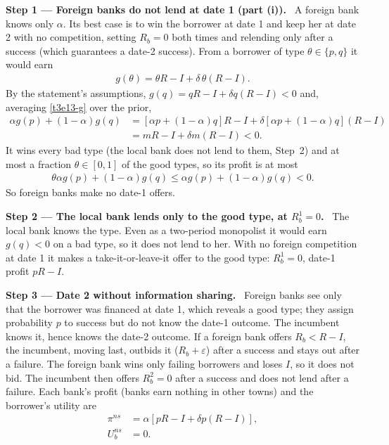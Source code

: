 \documentclass[11pt,a4paper]{article}
\newcommand{\step}[2]{\par\medskip\noindent\textbf{Step #1 --- #2.}~}
\begin{document}
\step{1}{Foreign banks do not lend at date 1 (part (i))} A foreign bank knows only $\alpha$. Its best case
is to win the borrower at date 1 and keep her at date 2 with no competition, setting $R_b=0$ both times
and relending only after a success (which guarantees a date-2 success). From a borrower of
type $\theta\in\{p,q\}$ it would earn
\begin{align}
  g(\theta) = \theta R-I+\delta\,\theta(R-I). \label{t3e13-g}
\end{align}
By the statement's assumptions, $g(q)=qR-I+\delta q(R-I)<0$ and, averaging \eqref{t3e13-g} over the prior,
\begin{align}
  \alpha g(p)+(1-\alpha)g(q) &= [\alpha p+(1-\alpha)q]R-I+\delta[\alpha p+(1-\alpha)q](R-I) \nonumber\\
  &= mR-I+\delta m(R-I)<0. \nonumber
\end{align}
It wins
every bad type (the local bank does not lend to them, Step~2) and at most a fraction $\theta\in[0,1]$
of the good types, so its profit is at most
\begin{align}
  \theta\alpha g(p)+(1-\alpha)g(q) \le \alpha g(p)+(1-\alpha)g(q) < 0. \nonumber
\end{align}
So foreign banks make no date-1 offers.

\step{2}{The local bank lends only to the good type, at $R_b^1=0$} The local bank knows the type. Even as a
two-period monopolist it would earn $g(q)<0$ on a bad type, so it does not lend to her. With no foreign
competition at date 1 it makes a take-it-or-leave-it offer to the good type: $R_b^1=0$, date-1 profit $pR-I$.

\step{3}{Date 2 without information sharing} Foreign banks see only that the borrower was financed at
date 1, which reveals a good type; they assign probability $p$ to success but do not know the date-1
outcome. The incumbent knows it, hence knows the date-2 outcome. If a foreign bank offers $R_b<R-I$, the
incumbent, moving last, outbids it ($R_b+\varepsilon$) after a success and stays out after a failure. The
foreign bank wins only failing borrowers and loses $I$, so it does not bid. The incumbent then offers
$R_b^2=0$ after a success and does not lend after a failure. Each bank's profit (banks earn nothing in
other towns) and the borrower's utility are
\begin{align}
  \pi^{ns} &= \alpha[pR-I+\delta p(R-I)], \label{t3e13-pins}\\
  U_b^{ns} &= 0. \label{t3e13-Uns}
\end{align}
\end{document}
